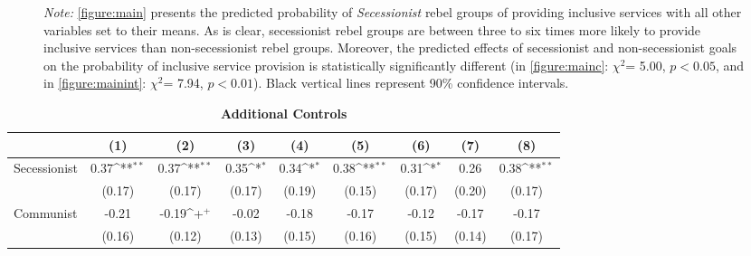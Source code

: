 \documentclass[12pt, letterpaper]{article}
\begin{document}
\begin{figure}[h!]
\begin{tablenotes}
\raggedright \footnotesize{\textit{Note:} \autoref{figure:main} presents the predicted probability of \textit{Secessionist} rebel groups of providing inclusive services with all other variables set to their means. As is clear, secessionist rebel groups are between three to six times more likely to provide inclusive services than non-secessionist rebel groups. Moreover, the predicted effects of secessionist and non-secessionist goals on the probability of inclusive service provision is statistically significantly different (in \autoref{figure:mainc}: ${\chi^2}$= 5.00, $p<0.05$, and in \autoref{figure:mainint}: ${\chi^2}$= 7.94, $p<0.01$). Black vertical lines represent 90\% confidence intervals.}
\end{tablenotes}
\end{figure}

\newpage
\begin{table}[htbp]\centering
\begin{small}
\def\sym#1{\ifmmode^{#1}\else\(^{#1}\)\fi}
\makeatletter
\def\myrow{}
\CT@everycr{\noalign{%
\global\let\CT@row@color\relax
\stepcounter{mym3}%
\ifnum\value{mym3}=2
  \gdef\myrow{\rowcolor{gray!50}}
\else\ifnum\value{mym3}=4
  \gdef\myrow{}
\fi\fi
}\myrow}
\renewcommand\thetable{A.\Roman{table}}
\caption{\textbf{Additional Controls }}
\label{table:addcontrols1}
\begin{tabular}{l*{8}{c}}
\hline\hline
                    &\multicolumn{1}{c}{(1)}&\multicolumn{1}{c}{(2)}&\multicolumn{1}{c}{(3)}&\multicolumn{1}{c}{(4)}&\multicolumn{1}{c}{(5)}&\multicolumn{1}{c}{(6)}&\multicolumn{1}{c}{(7)}&\multicolumn{1}{c}{(8)}\\
\hline
Secessionist     &        0.37\sym{**} &        0.37\sym{**} &        0.35\sym{*}  &        0.34\sym{*}  &        0.38\sym{**} &        0.31\sym{*}  &        0.26         &        0.38\sym{**} \\
                    &      (0.17)         &      (0.17)         &      (0.17)         &      (0.19)         &      (0.15)         &      (0.17)         &      (0.20)         &      (0.17)         \\
Communist           &       -0.21         &       -0.19\sym{+}  &       -0.02         &       -0.18         &       -0.17         &       -0.12         &       -0.17         &       -0.17         \\
                    &      (0.16)         &      (0.12)         &      (0.13)         &      (0.15)         &      (0.16)         &      (0.15)         &      (0.14)         &      (0.17)         \\

\end{tabular}
\end{small}
\end{table}
\end{document}
